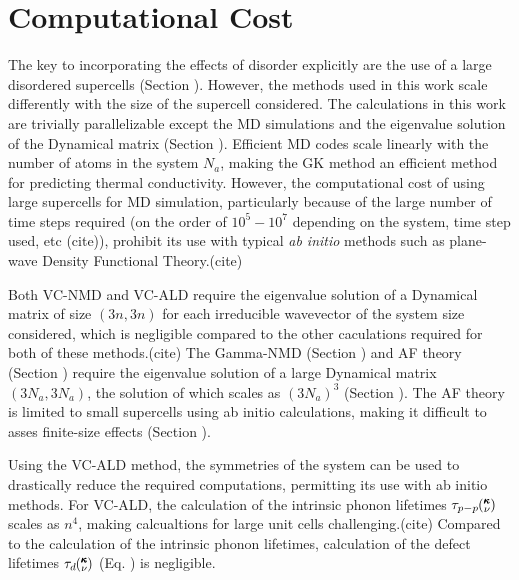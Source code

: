 \documentclass[aps,prb,twocolumn,superscriptaddress,amsmath,amssymb,floatfix]{revtex4}
\newcommand{\kv}{\mspace{-4.0mu}\left(\mspace{-8.0mu}
\begin{smallmatrix}&\pmb{\kappa} \\&\nu\end{smallmatrix}
\mspace{-3.0mu}\right)}
\begin{document}
\section{\label{A:Computational Cost}
Computational Cost}

The key to incorporating the effects of disorder explicitly are the use 
of a large disordered supercells (Section ).  However, the methods used 
in this work scale differently with the size of the supercell considered. 
The calculations in this work are trivially parallelizable\cite{} 
except the 
MD simulations\cite{plimpton_fast_1995} and the eigenvalue solution of the 
Dynamical matrix (Section ).\cite{gale_general_2003} Efficient MD 
codes scale linearly with the number of atoms in the system $N_a$, making 
the GK method an efficient method for predicting thermal conductivity. 
However, the computational cost of using large supercells for MD simulation, 
particularly because of the large number of time steps required 
(on the order of $10^5 - 10^7$ depending on the 
system, time step used, etc (cite)), prohibit its use with typical 
\emph{ab initio} methods such as 
plane-wave Density Functional Theory.(cite) 

Both VC-NMD and VC-ALD require the eigenvalue solution 
of a Dynamical matrix of size $(3n,3n)$ for each irreducible wavevector 
of the system size considered, 
which is negligible compared to the other 
caculations required for both of these methods.(cite) 
The Gamma-NMD (Section ) and AF theory (Section ) 
require the eigenvalue solution of a large Dynamical matrix $(3N_a,3N_a)$, 
the solution of which scales as $(3N_a)^3$ (Section ). 
The AF theory is limited 
to small supercells using ab initio calculations, making it difficult 
to asses finite-size effects (Section ).  

Using the VC-ALD method, the symmetries of the system can be 
used to drastically reduce the required computations, permitting its 
use with ab initio methods.
\cite{esfarjani_method_2008,turney_predicting_2009,
esfarjani_heat_2011,chaput_phonon-phonon_2011} 
For VC-ALD, the calculation of the intrinsic phonon 
lifetimes $\tau_{p-p}\kv$ scales as $n^4$,\cite{turney_predicting_2009}  
making calcualtions for large unit cells challenging.(cite) 
Compared to 
the calculation of the intrinsic phonon lifetimes, calculation 
of the defect lifetimes $\tau_d\kv$ (Eq. ) is negligible.
\end{document}
